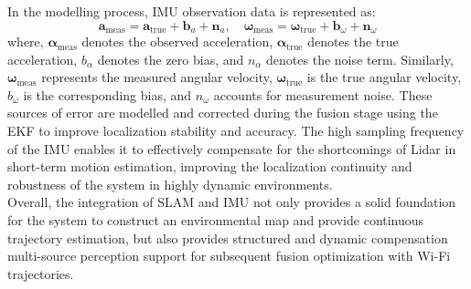 \documentclass[12pt,a4paper]{article}
\numberwithin{equation}{section}
\begin{document}
In the modelling process, IMU observation data is represented as:
\begin{equation}
\boldsymbol{a}_{\text{meas}} = \boldsymbol{a}_{\text{true}} + \boldsymbol{b}_a + \boldsymbol{n}_a,
\quad
\boldsymbol{\omega}_{\text{meas}} = \boldsymbol{\omega}_{\text{true}} + \boldsymbol{b}_\omega + \boldsymbol{n}_\omega
\end{equation}
where, $\boldsymbol{\alpha}_{\text{meas}}$ denotes the observed acceleration, $\boldsymbol{\alpha}_{\text{true}}$ denotes the true acceleration, ${b}_\alpha$ denotes the zero bias, and ${n}_\alpha$ denotes the noise term. Similarly, $\boldsymbol{\omega}_{\text{meas}}$ represents the measured angular velocity, $\boldsymbol{\omega}_{\text{true}}$ is the true angular velocity, ${b}_\omega$ is the corresponding bias, and ${n}_\omega$ accounts for measurement noise. These sources of error are modelled and corrected during the fusion stage using the EKF to improve localization stability and accuracy. The high sampling frequency of the IMU enables it to effectively compensate for the shortcomings of Lidar in short-term motion estimation, improving the localization continuity and robustness of the system in highly dynamic environments.\\
Overall, the integration of SLAM and IMU not only provides a solid foundation for the system to construct an environmental map and provide continuous trajectory estimation, but also provides structured and dynamic compensation multi-source perception support for subsequent fusion optimization with Wi-Fi trajectories.
\end{document}
